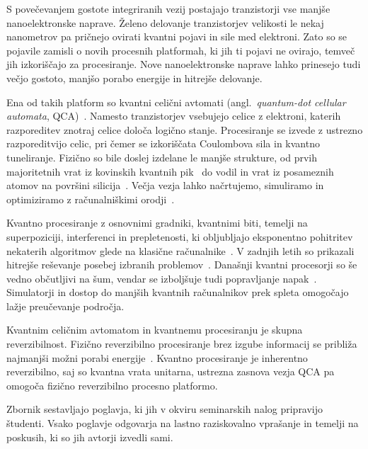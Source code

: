 
S povečevanjem gostote integriranih vezij postajajo tranzistorji vse manjše nanoelektronske naprave. Želeno delovanje tranzistorjev velikosti le nekaj nanometrov pa pričnejo ovirati kvantni pojavi in sile med elektroni. Zato so se pojavile zamisli o novih procesnih platformah, ki jih ti pojavi ne ovirajo, temveč jih izkoriščajo za procesiranje. Nove nanoelektronske naprave lahko prinesejo tudi večjo gostoto, manjšo porabo energije in hitrejše delovanje.

Ena od takih platform so kvantni celični avtomati (angl.\ \emph{quantum-dot cellular automata}, QCA)~\cite{lent1993, lent1997}. Namesto tranzistorjev vsebujejo celice z elektroni, katerih razporeditev znotraj celice določa logično stanje. Procesiranje se izvede z ustrezno razporeditvijo celic, pri čemer se izkoriščata Coulombova sila in kvantno tuneliranje. Fizično so bile doslej izdelane le manjše strukture, od prvih majoritetnih vrat iz kovinskih kvantnih pik~\cite{amlani1999} do vodil in vrat iz posameznih atomov na površini silicija~\cite{huff2018}. Večja vezja lahko načrtujemo, simuliramo in optimiziramo z računalniškimi orodji~\cite{walus2004, silltorres2018, walter2019fiction}.

Kvantno procesiranje z osnovnimi gradniki, kvantnimi biti, temelji na superpoziciji, interferenci in prepletenosti, ki obljubljajo eksponentno pohitritev nekaterih algoritmov glede na klasične računalnike~\cite{nielsen2010}. V zadnjih letih so prikazali hitrejše reševanje posebej izbranih problemov~\cite{arute2019quantum, wu2021strong}. Današnji kvantni procesorji so še vedno občutljivi na šum, vendar se izboljšuje tudi popravljanje napak~\cite{google2025below}. Simulatorji in dostop do manjših kvantnih računalnikov prek spleta omogočajo lažje preučevanje področja.

Kvantnim celičnim avtomatom in kvantnemu procesiranju je skupna reverzibilnost. Fizično reverzibilno procesiranje brez izgube informacij se približa najmanjši možni porabi energije~\cite{landauer1961, bennett1973}. Kvantno procesiranje je inherentno reverzibilno, saj so kvantna vrata unitarna, ustrezna zasnova vezja QCA pa omogoča fizično reverzibilno procesno platformo.

Zbornik sestavljajo poglavja, ki jih v okviru seminarskih nalog pripravijo študenti. Vsako poglavje odgovarja na lastno raziskovalno vprašanje in temelji na poskusih, ki so jih avtorji izvedli sami.
